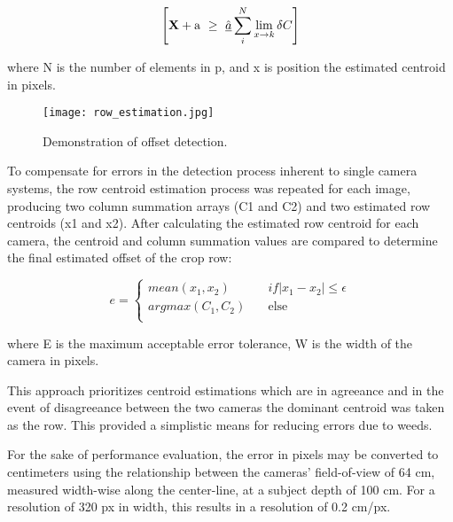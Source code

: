 \begin{equation}
  \left[
    {\bf X} + {\rm a} \ \geq\ 
    \underline{\hat a} \sum_i^N \lim_{x \rightarrow k} \delta C
  \right]
  \label{eq:centroid}
\end{equation}
\begin{flushleft}
where N is the number of elements in p, and x is position the estimated centroid in pixels.
\begin{flushleft}

\begin{figure}
  \centering
  \texttt{[image: row\_estimation.jpg]}
  \caption{Demonstration of offset detection.}
  \label{fig:row_estimation}
\end{figure}

To compensate for errors in the detection process inherent to single
camera systems, the row centroid estimation process was repeated for
each image, producing two column summation arrays (C1 and C2) and two
estimated row centroids (x1 and x2). After calculating the estimated
row centroid for each camera, the centroid and column summation values
are compared to determine the final estimated offset of the crop row:

\begin{equation}
  e = 
  \begin{cases}
    mean(x_{1},x_{2})  & \quad if |x_{1}-x_{2}| \leq \epsilon\\
    argmax(C_{1},C_{2})  & \quad \text{else}\\
  \end{cases}
  \label{eq:camera_selection}
\end{equation}
\begin{flushleft}
where E is the maximum acceptable error tolerance, W is the width of
the camera in pixels. 
\end{flushleft}

This approach prioritizes centroid estimations which are in agreeance
and in the event of disagreeance between the two cameras the dominant
centroid was taken as the row. This provided a simplistic means for
reducing errors due to weeds.

For the sake of performance evaluation, the error in pixels may be
converted to centimeters using the relationship between the cameras’
field-of-view of 64 cm, measured width-wise along the center-line, at
a subject depth of 100 cm. For a resolution of 320 px in width, this
results in a resolution of 0.2 cm/px.


\end{flushleft}
\end{flushleft}
